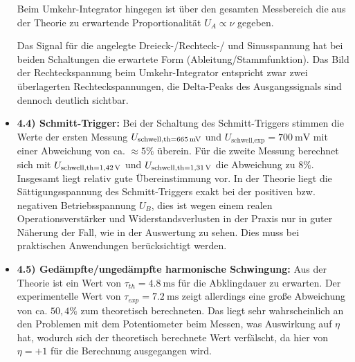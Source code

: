 \documentclass{scrartcl}
\begin{document}
\begin{itemize}
Beim Umkehr-Integrator hingegen ist über den gesamten Messbereich die aus der Theorie zu erwartende Proportionalität $U_A\propto \nu$ gegeben.

Das Signal für die angelegte Dreieck-/Rechteck-/ und Sinusspannung hat bei beiden Schaltungen die erwartete Form (Ableitung/Stammfunktion). 
Das Bild der Rechteckspannung beim Umkehr-Integrator entspricht zwar zwei überlagerten Rechteckspannungen, die Delta-Peaks des Ausgangssignals sind dennoch deutlich sichtbar.
\item \textbf{4.4) Schmitt-Trigger:} Bei der Schaltung des Schmitt-Triggers stimmen die Werte der ersten Messung $U_\text{schwell,th=\SI{665}{\milli \volt}}$ und $U_\text{schwell,exp}=\SI{700}{\milli \volt}$ mit einer Abweichung von ca. $≈5\%$ überein.
Für die zweite Messung berechnet sich mit $U_\text{schwell,th=\SI{1,42}{\volt}}$ und $U_\text{schwell,th=\SI{1,31}{\volt}}$ die Abweichung zu $8\%$.
Insgesamt liegt relativ gute Übereinstimmung vor.
In der Theorie liegt die Sättigungsspannung des Schmitt-Triggers exakt bei der positiven bzw. negativen Betriebsspannung $U_B$, dies ist wegen einem realen Operationsverstärker und Widerstandsverlusten in der Praxis nur in guter Näherung der Fall, wie in der Auswertung zu sehen.
Dies muss bei praktischen Anwendungen berücksichtigt werden.
\item \textbf{4.5) Gedämpfte/ungedämpfte harmonische Schwingung:} Aus der Theorie ist ein Wert von $\tau_{th}=\SI{4,8}{\milli \second}$ für die Abklingdauer zu erwarten.
Der experimentelle Wert von $\tau_{exp}=\SI{7,2}{\milli \second}$ zeigt allerdings eine große Abweichung von  ca. $ 50,4\%$ zum theoretisch berechneten.
Das liegt sehr wahrscheinlich an den Problemen mit dem Potentiometer beim Messen, was Auswirkung auf $\eta$ hat, wodurch sich der theoretisch berechnete Wert verfälscht, da hier von $\eta=+1$ für die Berechnung ausgegangen wird.


\end{itemize}
\end{document}

